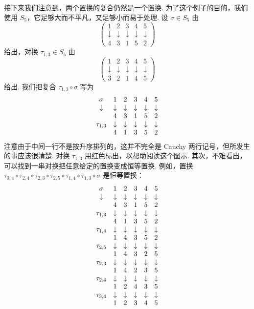 接下来我们注意到，两个置换的复合仍然是一个置换. 为了这个例子的目的，我们使用 $S_5$，它足够大而不平凡，又足够小而易于处理. 设 $\sigma\in S_5$ 由
\[
\begin{pmatrix}1&2&3&4&5\\\downarrow&\downarrow&\downarrow&\downarrow&\downarrow\\4&3&1&5&2\end{pmatrix}
\]
给出，对换 $\tau_{1,3}\in S_5$ 由
\[
\begin{pmatrix}1&2&3&4&5\\\downarrow&\downarrow&\downarrow&\downarrow&\downarrow\\3&2&1&4&5\end{pmatrix}
\]
给出. 我们把复合 $\tau_{1,3}\circ\sigma$ 写为
\[
\begin{array}{c c c c c c}
\sigma&1&2&3&4&5\\
\downarrow&\downarrow&\downarrow&\downarrow&\downarrow&\downarrow\\
&4&3&1&5&2\\
\tau_{1,3}&\downarrow&\downarrow&\downarrow&\downarrow&\downarrow\\
&4&1&3&5&2
\end{array}
\]
注意由于中间一行不是按升序排列的，这并不完全是 Cauchy 两行记号，但所发生的事应该很清楚. 对换 $\tau_{1,3}$ 用红色标出，以帮助阅读这个图示. 其次，不难看出，可以找到一串对换把任意给定的置换变成恒等置换. 例如，置换 $\tau_{3,4}\circ\tau_{2,4}\circ\tau_{2,3}\circ\tau_{2,5}\circ\tau_{1,4}\circ\tau_{1,3}\circ\sigma$ 是恒等置换：
\[
\begin{array}{c c c c c c}
\sigma&1&2&3&4&5\\
\downarrow&\downarrow&\downarrow&\downarrow&\downarrow&\downarrow\\
&4&3&1&5&2\\
\tau_{1,3}&\downarrow&\downarrow&\downarrow&\downarrow&\downarrow\\
&4&1&3&5&2\\
\tau_{1,4}&\downarrow&\downarrow&\downarrow&\downarrow&\downarrow\\
&1&4&3&5&2\\
\tau_{2,5}&\downarrow&\downarrow&\downarrow&\downarrow&\downarrow\\
&1&4&3&2&5\\
\tau_{2,3}&\downarrow&\downarrow&\downarrow&\downarrow&\downarrow\\
&1&4&2&3&5\\
\tau_{2,4}&\downarrow&\downarrow&\downarrow&\downarrow&\downarrow\\
&1&2&4&3&5\\
\tau_{3,4}&\downarrow&\downarrow&\downarrow&\downarrow&\downarrow\\
&1&2&3&4&5
\end{array}
\]
